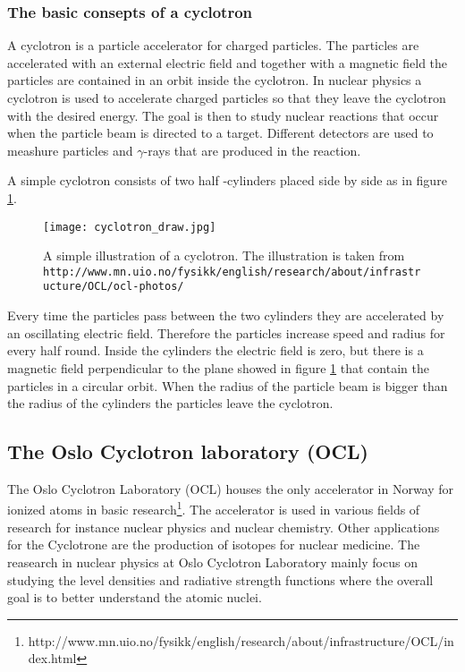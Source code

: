 \documentclass[11pt,a4wide]{article}
\begin{document}
\subsubsection*{The basic consepts of a cyclotron}
A cyclotron is a particle accelerator for charged particles. The particles are accelerated with an external electric field and together with a magnetic field the particles are contained in an orbit inside the cyclotron. In nuclear physics a cyclotron is used to accelerate charged particles so that they leave the cyclotron with the desired energy. The goal is then to study nuclear reactions that occur when the particle beam is directed to a target. Different detectors are used to meashure particles and $\gamma$-rays that are produced in the reaction. 

A simple cyclotron consists of two half -cylinders placed side by side as in figure \ref{fig:cyclotron_draw}.
\begin{figure}[htp]
\centering
\texttt{[image: cyclotron\_draw.jpg]}
\caption{A simple illustration of a cyclotron. The illustration is taken from \texttt{http://www.mn.uio.no/fysikk/english/research/about/infrastructure/OCL/ocl-photos/}}
\label{fig:cyclotron_draw}
\end{figure}
Every time the particles pass between the two cylinders they are accelerated by an oscillating electric field. Therefore the particles increase speed and radius for every half round. Inside the cylinders the electric field is zero, but there is a magnetic field perpendicular to the plane showed in figure \ref{fig:cyclotron_draw} that contain the particles in a circular orbit. When the radius of the particle beam is bigger than the radius of the cylinders the particles leave the cyclotron. 

\subsection{The Oslo Cyclotron laboratory (OCL)}
The Oslo Cyclotron Laboratory (OCL) houses the only accelerator in Norway for ionized atoms in basic research\footnote{http://www.mn.uio.no/fysikk/english/research/about/infrastructure/OCL/index.html}. The accelerator is used in various fields of research for instance nuclear physics and nuclear chemistry. Other applications for the Cyclotrone are the production of isotopes for nuclear medicine. The reasearch in nuclear physics at Oslo Cyclotron Laboratory mainly focus on studying the level densities and radiative strength functions where the overall goal is to better understand the atomic nuclei. 
\end{document}
